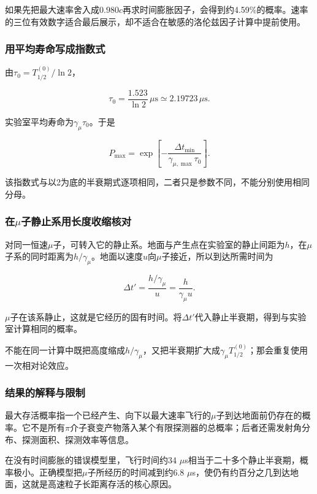 \documentclass[12pt,a4paper,fontset=fandol]{ctexart}
\begin{document}
如果先把最大速率舍入成\(0.980c\)再求时间膨胀因子，会得到约4.59\%的概率。速率的三位有效数字适合最后展示，却不适合在敏感的洛伦兹因子计算中提前使用。

\subsubsection{用平均寿命写成指数式}\label{ux7528ux5e73ux5747ux5bffux547dux5199ux6210ux6307ux6570ux5f0f}

由\(\tau_0=T_{1/2}^{(0)}/\ln2\)，

\[
\tau_0=\frac{1.523}{\ln2}\,\mu\mathrm s
\simeq2.19723\,\mu\mathrm s.
\]

实验室平均寿命为\(\gamma_\mu\tau_0\)。于是

\[
P_{\max}
=\exp\left[-\frac{\Delta t_{\min}}
{\gamma_{\mu,\max}\tau_0}\right].
\]

该指数式与以2为底的半衰期式逐项相同，二者只是参数不同，不能分别使用相同分母。

\subsubsection{\texorpdfstring{在\(\mu\)子静止系用长度收缩核对}{在\textbackslash mu子静止系用长度收缩核对}}\label{ux5728muux5b50ux9759ux6b62ux7cfbux7528ux957fux5ea6ux6536ux7f29ux6838ux5bf9}

对同一恒速\(\mu\)子，可转入它的静止系。地面与产生点在实验室的静止间距为\(h\)，在\(\mu\)子系的同时距离为\(h/\gamma_\mu\)。地面以速度\(u\)向\(\mu\)子接近，所以到达所需时间为

\[
\Delta t'=\frac{h/\gamma_\mu}{u}
=\frac{h}{\gamma_\mu u}.
\]

\(\mu\)子在该系静止，这就是它经历的固有时间。将\(\Delta t'\)代入静止半衰期，得到与实验室计算相同的概率。

不能在同一计算中既把高度缩成\(h/\gamma_\mu\)，又把半衰期扩大成\(\gamma_\mu T_{1/2}^{(0)}\)；那会重复使用一次相对论效应。

\subsubsection{结果的解释与限制}\label{ux7ed3ux679cux7684ux89e3ux91caux4e0eux9650ux5236}

最大存活概率指一个已经产生、向下以最大速率飞行的\(\mu\)子到达地面前仍存在的概率。它不是所有\(\pi\)介子衰变产物落入某个有限探测器的总概率；后者还需发射角分布、探测面积、探测效率等信息。

在没有时间膨胀的错误模型里，飞行时间约34
\(\mu\)s相当于二十多个静止半衰期，概率极小。正确模型把\(\mu\)子所经历的时间减到约6.8
\(\mu\)s，使仍有约百分之几到达地面，这就是高速粒子长距离存活的核心原因。
\end{document}
